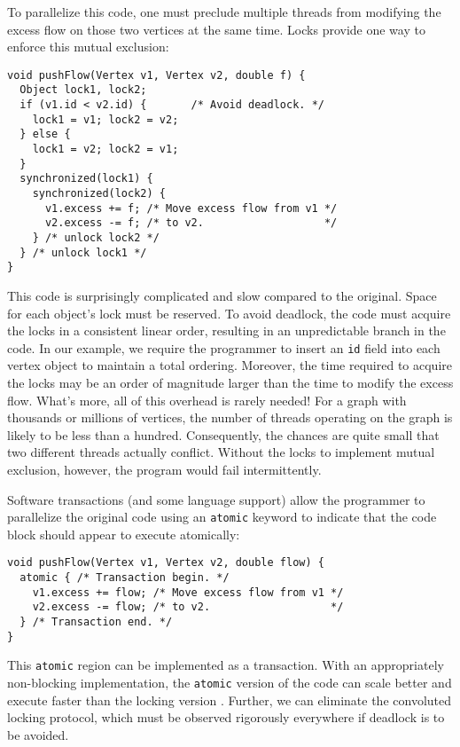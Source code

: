 \documentclass[preprint]{rdbacmconf}
\begin{document}
To parallelize this code, one must preclude multiple threads from
modifying the excess flow on those two vertices at the same time.
Locks provide one way to enforce this mutual exclusion: 
\par {\footnotesize\samepage
\begin{verbatim}
void pushFlow(Vertex v1, Vertex v2, double f) {
  Object lock1, lock2;
  if (v1.id < v2.id) {       /* Avoid deadlock. */
    lock1 = v1; lock2 = v2;
  } else {
    lock1 = v2; lock2 = v1;
  }
  synchronized(lock1) {
    synchronized(lock2) {
      v1.excess += f; /* Move excess flow from v1 */
      v2.excess -= f; /* to v2.                   */
    } /* unlock lock2 */
  } /* unlock lock1 */
}
\end{verbatim}
}

This code is surprisingly complicated and slow compared to the
original.  Space for each object's lock must be reserved.
To avoid deadlock, the code must acquire the locks in
a consistent linear order, resulting in an unpredictable branch in the
code.  In our example, 
we require the programmer to insert an \texttt{id} field into
each vertex object to maintain a total ordering.
Moreover, the time required to acquire the locks may be
an order of magnitude larger than the time to
modify the excess flow.
What's more, all of this overhead is rarely
needed!  For a graph with thousands or millions of vertices, the
number of threads operating on the graph is likely to be less than a
hundred.  Consequently, the chances are quite small that two different
threads actually conflict.  Without the locks to implement mutual
exclusion, however, the program would fail intermittently.

Software transactions (and some language support) allow the
programmer to parallelize the original code using an \texttt{atomic}
keyword to indicate that the code block should appear to execute
atomically: 
\par {\footnotesize\samepage
\begin{verbatim}
void pushFlow(Vertex v1, Vertex v2, double flow) {
  atomic { /* Transaction begin. */
    v1.excess += flow; /* Move excess flow from v1 */
    v2.excess -= flow; /* to v2.                   */
  } /* Transaction end. */
}
\end{verbatim}
} 

This {\tt atomic} region can be implemented as a transaction.
With an appropriately non-blocking implementation, the {\tt atomic}
version of the code can scale better and execute faster than the locking version
\cite{AnanianAsKuLeLi04,HarrisFr03,GreenwaldCh96,MassalinPu91,HerlihyMo93,ShavitTo95}.
Further, we can eliminate the convoluted locking protocol, which must
be observed rigorously everywhere if deadlock is to be avoided.
\end{document}
